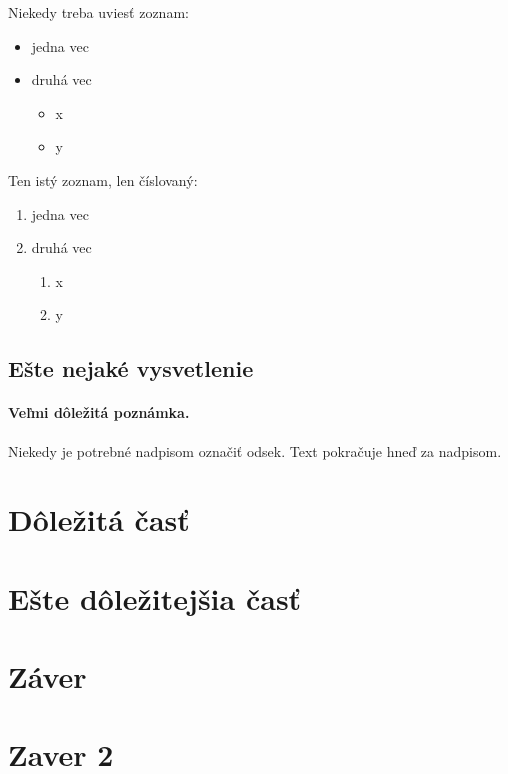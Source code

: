 \documentclass[10pt,twoside,slovak,a4paper, colorinlistoftodos]{article}
\begin{document}
Niekedy treba uviesť zoznam:

\begin{itemize}
\item jedna vec
\item druhá vec
	\begin{itemize}
	\item x
	\item y
	\end{itemize}
\end{itemize}

Ten istý zoznam, len číslovaný:

\begin{enumerate}
\item jedna vec
\item druhá vec
	\begin{enumerate}
	\item x
	\item y
	\end{enumerate}
\end{enumerate}


\subsection{Ešte nejaké vysvetlenie} \label{ina:este}

\paragraph{Veľmi dôležitá poznámka.}
Niekedy je potrebné nadpisom označiť odsek. Text pokračuje hneď za nadpisom.



\section{Dôležitá časť} \label{dolezita}




\section{Ešte dôležitejšia časť} \label{dolezitejsia}




\section{Záver} \label{zaver} %



\section{Zaver 2}





 
\end{document}
